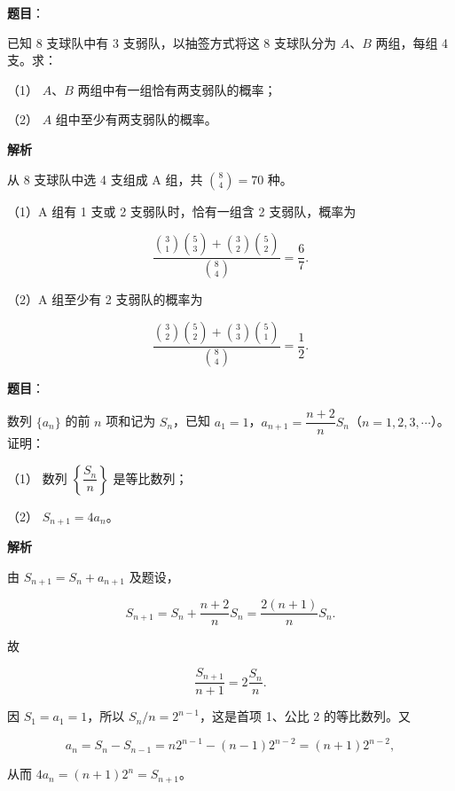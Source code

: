 \begin{answer}

\textbf{题目}：

已知 8 支球队中有 3 支弱队，以抽签方式将这 8 支球队分为 $A\text{、}B$ 两组，每组 4 支。求：

（1） $A\text{、}B$ 两组中有一组恰有两支弱队的概率；

（2） $A$ 组中至少有两支弱队的概率。

\textbf{解析}


从 8 支球队中选 4 支组成 A 组，共 $\binom84=70$ 种。

（1）A 组有 1 支或 2 支弱队时，恰有一组含 2 支弱队，概率为

\nopagebreak[4]
\[
\frac{\binom31\binom53+\binom32\binom52}{\binom84}
=\frac67.
\]


（2）A 组至少有 2 支弱队的概率为

\nopagebreak[4]
\[
\frac{\binom32\binom52+\binom33\binom51}{\binom84}
=\frac12.
\]



\end{answer}
\begin{answer}

\textbf{题目}：

数列 $\{a_n\}$ 的前 $n$ 项和记为 $S_n$，已知 $a_1=1$，$a_{n+1}=\dfrac{n+2}{n}S_n$（$n=1,2,3,\cdots$）。证明：

（1） 数列 $\left\{\dfrac{S_n}{n}\right\}$ 是等比数列；

（2） $S_{n+1}=4a_n$。

\textbf{解析}


由 $S_{n+1}=S_n+a_{n+1}$ 及题设，

\nopagebreak[4]
\[
S_{n+1}
=S_n+\frac{n+2}{n}S_n
=\frac{2(n+1)}nS_n.
\]

故

\nopagebreak[4]
\[
\frac{S_{n+1}}{n+1}=2\frac{S_n}{n}.
\]


因 $S_1=a_1=1$，所以 $S_n/n=2^{n-1}$，这是首项 1、公比 2 的等比数列。又

\nopagebreak[4]
\[
a_n=S_n-S_{n-1}
=n2^{n-1}-(n-1)2^{n-2}
=(n+1)2^{n-2},
\]

从而 $4a_n=(n+1)2^n=S_{n+1}$。



\end{answer}
